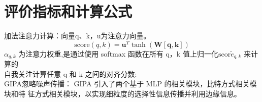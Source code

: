 \documentclass{article}
\begin{document}
\section*{评价指标和计算公式}
加法注意力计算：向量q、k，u为注意力向量。
$$ \text{score}(q, k) = \mathbf{u}^T \tanh(\mathbf{W}[\mathbf{q}, \mathbf{k}]) $$
$\alpha_{q,k}$ 为注意力权重,是通过使用 softmax 函数在所有 q，k 值上归一化$\text{scor}{\tilde{e}_{q,k}}$
来计算的\\
自我关注计算任意 q 和 k 之间的对齐分数:\\
GIPA忽略噪声传播： GIPA 引入了两个基于 MLP 的相关模块，比特方式相关模块和特
征方式相关模块，以实现细粒度的选择性信息传播并利用边缘信息。
\end{document}
